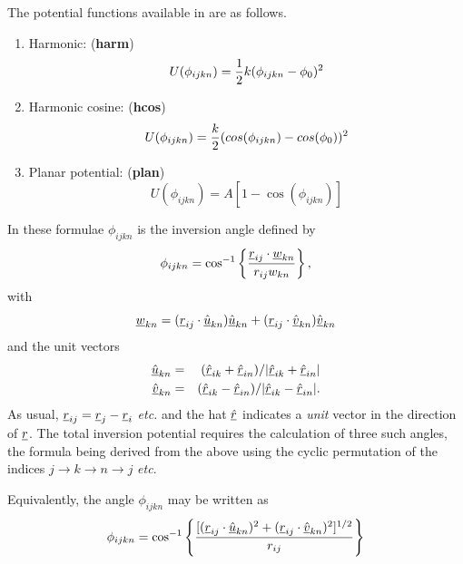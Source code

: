 The potential functions available in \D{} are as
follows.
\begin{enumerate}
\item Harmonic: ({\bf harm})
\begin{equation}
U(\phi_{ijkn})= {1\over 2} k (\phi_{ijkn} - \phi_0)^2 
\end{equation}
\item Harmonic cosine: ({\bf hcos})
\begin{equation}
U(\phi_{ijkn})={k\over 2}(cos(\phi_{ijkn}) -cos(\phi_{0}))^{2}
\end{equation}
\item Planar potential: ({\bf plan})
\begin{equation}
U(\phi_{ijkn})= A \left [ 1 - \cos (\phi_{ijkn})\right] 
\end{equation}
\end{enumerate}
In these formulae $\phi_{ijkn}$ is the inversion angle defined by
\begin{equation}
\phi_{ijkn}=\cos^{-1}\left \{\frac{\mbox{$\underline{r}$}_{ij}\cdot\mbox{$\underline{w}$}_{kn}}{r_{ij}w_{kn}}\right \},
\end{equation}
with
\begin{equation}
\mbox{$\underline{w}$}_{kn}=(\mbox{$\underline{r}$}_{ij}\cdot\mbox{$\underline{\hat{u}}$}_{kn})\mbox{$\underline{\hat{u}}$}_{kn}+
(\mbox{$\underline{r}$}_{ij}\cdot\mbox{$\underline{\hat{v}}$}_{kn})\mbox{$\underline{\hat{v}}$}_{kn}
\end{equation}
and the unit vectors
\begin{eqnarray}
\mbox{$\underline{\hat{u}}$}_{kn}&=&(\mbox{$\underline{\hat{r}}$}_{ik}+\mbox{$\underline{\hat{r}}$}_{in})/
|\mbox{$\underline{\hat{r}}$}_{ik}+\mbox{$\underline{\hat{r}}$}_{in}| \nonumber  \\
\mbox{$\underline{\hat{v}}$}_{kn}&=&(\mbox{$\underline{\hat{r}}$}_{ik}-\mbox{$\underline{\hat{r}}$}_{in})/
|\mbox{$\underline{\hat{r}}$}_{ik}-\mbox{$\underline{\hat{r}}$}_{in}|.
\end{eqnarray}
As usual, $\mbox{$\underline{r}$}_{ij}=\mbox{$\underline{r}$}_{j}-\mbox{$\underline{r}$}_{i}$ {\em etc.} and the
hat $\mbox{$\underline{\hat{r}}$}$ indicates a {\em unit} vector in the direction of
$\mbox{$\underline{r}$}$. The total inversion potential requires the calculation of
three such angles, the formula being derived from the above using the
cyclic permutation of the indices $j\rightarrow k \rightarrow n
\rightarrow j$ {\em etc}.

Equivalently, the angle $\phi_{ijkn}$ may be written as
\begin{equation}
\phi_{ijkn}=\cos^{-1} \left \{ \frac{
[(\mbox{$\underline{r}$}_{ij}\cdot\mbox{$\underline{\hat{u}}$}_{kn})^{2}
+(\mbox{$\underline{r}$}_{ij}\cdot\mbox{$\underline{\hat{v}}$}_{kn})^{2}]^{1/2}}{r_{ij}}\right \}
\end{equation}

